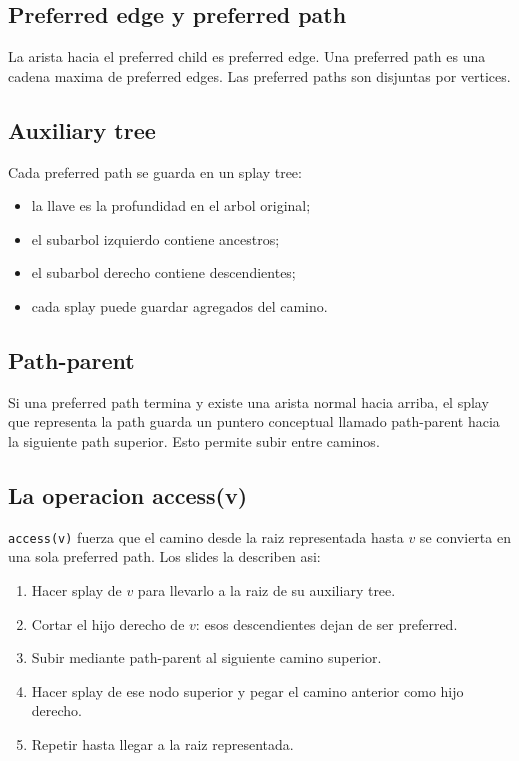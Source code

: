 \documentclass[10pt]{article}
\begin{document}
\subsection{Preferred edge y preferred path}
La arista hacia el preferred child es preferred edge. Una preferred path es una
cadena maxima de preferred edges. Las preferred paths son disjuntas por vertices.

\subsection{Auxiliary tree}
Cada preferred path se guarda en un splay tree:
\begin{itemize}[leftmargin=*]
\item la llave es la profundidad en el arbol original;
\item el subarbol izquierdo contiene ancestros;
\item el subarbol derecho contiene descendientes;
\item cada splay puede guardar agregados del camino.
\end{itemize}

\subsection{Path-parent}
Si una preferred path termina y existe una arista normal hacia arriba, el splay
que representa la path guarda un puntero conceptual llamado path-parent hacia la
siguiente path superior. Esto permite subir entre caminos.

\subsection{La operacion access(v)}
\texttt{access(v)} fuerza que el camino desde la raiz representada hasta $v$ se
convierta en una sola preferred path. Los slides la describen asi:
\begin{enumerate}[leftmargin=*]
\item Hacer splay de $v$ para llevarlo a la raiz de su auxiliary tree.
\item Cortar el hijo derecho de $v$: esos descendientes dejan de ser preferred.
\item Subir mediante path-parent al siguiente camino superior.
\item Hacer splay de ese nodo superior y pegar el camino anterior como hijo
derecho.
\item Repetir hasta llegar a la raiz representada.
\end{enumerate}
\end{document}
